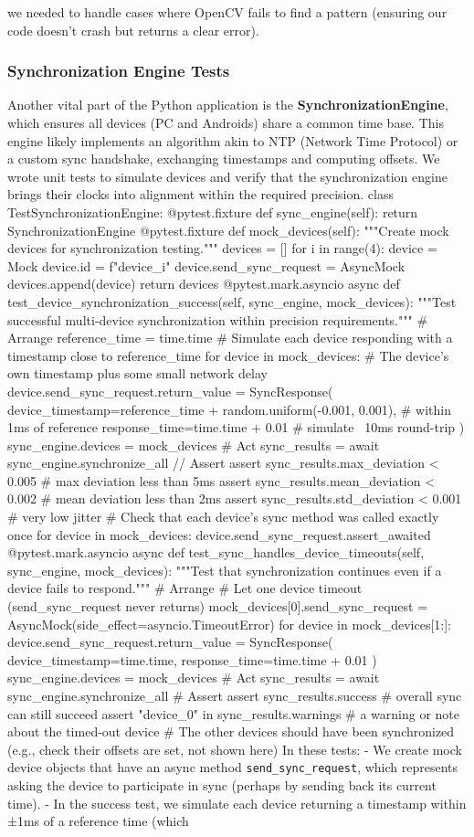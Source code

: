 we needed to handle cases where OpenCV fails to find a pattern (ensuring our code doesn't crash but returns a clear error). \subsubsection{Synchronization Engine Tests} Another vital part of the Python application is the \textbf{SynchronizationEngine}, which ensures all devices (PC and Androids) share a common time base. This engine likely implements an algorithm akin to NTP (Network Time Protocol) or a custom sync handshake, exchanging timestamps and computing offsets. We wrote unit tests to simulate devices and verify that the synchronization engine brings their clocks into alignment within the required precision. class TestSynchronizationEngine: @pytest.fixture def sync_engine(self): return SynchronizationEngine @pytest.fixture def mock_devices(self): """Create mock devices for synchronization testing.""" devices = [] for i in range(4): device = Mock device.id = f"device_{i}" device.send_sync_request = AsyncMock devices.append(device) return devices @pytest.mark.asyncio async def test_device_synchronization_success(self, sync_engine, mock_devices): """Test successful multi-device synchronization within precision requirements.""" # Arrange reference_time = time.time # Simulate each device responding with a timestamp close to reference_time for device in mock_devices: # The device's own timestamp plus some small network delay device.send_sync_request.return_value = SyncResponse( device_timestamp=reference_time + random.uniform(-0.001, 0.001), # within 1ms of reference response_time=time.time + 0.01 # simulate ~10ms round-trip ) sync_engine.devices = mock_devices # Act sync_results = await sync_engine.synchronize_all // Assert assert sync_results.max_deviation < 0.005 # max deviation less than 5ms assert sync_results.mean_deviation < 0.002 # mean deviation less than 2ms assert sync_results.std_deviation < 0.001 # very low jitter # Check that each device's sync method was called exactly once for device in mock_devices: device.send_sync_request.assert_awaited @pytest.mark.asyncio async def test_sync_handles_device_timeouts(self, sync_engine, mock_devices): """Test that synchronization continues even if a device fails to respond.""" # Arrange # Let one device timeout (send_sync_request never returns) mock_devices[0].send_sync_request = AsyncMock(side_effect=asyncio.TimeoutError) for device in mock_devices[1:]: device.send_sync_request.return_value = SyncResponse( device_timestamp=time.time, response_time=time.time + 0.01 ) sync_engine.devices = mock_devices # Act sync_results = await sync_engine.synchronize_all # Assert assert sync_results.success # overall sync can still succeed assert "device_0" in sync_results.warnings # a warning or note about the timed-out device # The other devices should have been synchronized (e.g., check their offsets are set, not shown here) In these tests: - We create mock device objects that have an async method \texttt{send_sync_request}, which represents asking the device to participate in sync (perhaps by sending back its current time). - In the success test, we simulate each device returning a timestamp within ±1ms of a reference time (which 
